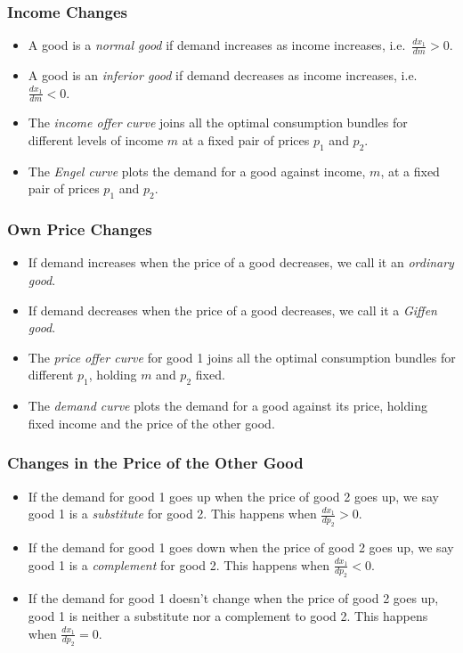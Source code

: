\documentclass{article}
\begin{document}
\subsubsection*{Income Changes}
\begin{itemize}
  \item A good is a \emph{normal good} if demand increases as income increases,
    i.e.~$\frac{dx_1}{dm}>0$.
  \item A good is an \emph{inferior good} if demand decreases as income increases,
    i.e.~$\frac{dx_1}{dm}<0$.
  \item The \emph{income offer curve} joins all the optimal consumption bundles
    for different levels of income $m$ at a fixed pair of prices $p_1$ and
    $p_2$.
  \item The \emph{Engel curve} plots the demand for a good against income, $m$,
    at a fixed pair of prices $p_1$ and $p_2$.
\end{itemize}
\subsubsection*{Own Price Changes}
\begin{itemize}
  \item If demand increases when the price of a good decreases, we call it an
    \emph{ordinary good}.
  \item If demand decreases when the price of a good decreases, we call it a
    \emph{Giffen good}.
  \item The \emph{price offer curve} for good 1 joins all the optimal consumption
    bundles for different $p_1$, holding $m$ and $p_2$ fixed.
  \item The \emph{demand curve} plots the demand for a good against its price,
    holding fixed income and the price of the other good.
\end{itemize}
\subsubsection*{Changes in the Price of the Other Good}
\begin{itemize}
  \item If the demand for good 1 goes up when the price of good 2 goes up, we
    say good 1 is a \emph{substitute} for good 2. This happens when
    $\frac{dx_1}{dp_2}>0$.
  \item If the demand for good 1 goes down when the price of good 2 goes up, we
    say good 1 is a \emph{complement} for good 2. This happens when
    $\frac{dx_1}{dp_2}<0$.
  \item If the demand for good 1 doesn't change when the price of good 2 goes
    up, good 1 is neither a substitute nor a complement to good 2. This
    happens when $\frac{dx_1}{dp_2}=0$.
\end{itemize}
\end{document}
